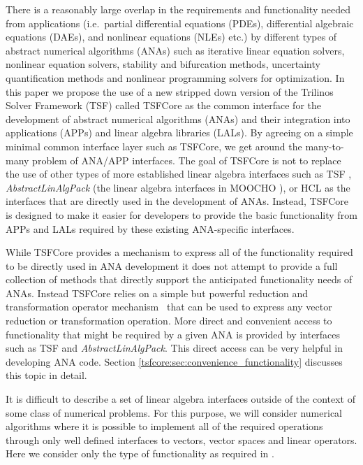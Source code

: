 \documentclass[10pt,fleqn]{article}
\begin{document}
There is a reasonably large overlap in the requirements and
functionality needed from applications (i.e.~partial differential
equations (PDEs), differential algebraic equations (DAEs), and
nonlinear equations (NLEs) etc.) by different types of abstract
numerical algorithms (ANAs) such as iterative linear equation solvers,
nonlinear equation solvers, stability and bifurcation methods,
uncertainty quantification methods and nonlinear programming solvers
for optimization.  In this paper we propose the use of a new stripped
down version of the Trilinos Solver Framework (TSF) called TSFCore as
the common interface for the development of abstract numerical
algorithms (ANAs) and their integration into applications (APPs) and
linear algebra libraries (LALs).  By agreeing on a simple minimal
common interface layer such as TSFCore, we get around the many-to-many
problem of ANA/APP interfaces.  The goal of TSFCore is not to
replace the use of other types of more established linear algebra
interfaces such as TSF \cite{ref:TSF}, \textit{AbstractLinAlgPack}
(the linear algebra interfaces in MOOCHO \cite{ref:moochouserguide}),
or HCL \cite{ref:hcl} as the interfaces that are directly used in the
development of ANAs.  Instead, TSFCore is designed to make it easier
for developers to provide the basic functionality from APPs and LALs
required by these existing ANA-specific interfaces.  

While TSFCore provides a mechanism to express 
all of the functionality required to be directly used in ANA
development it does not attempt to provide a full collection of 
methods that directly support the anticipated functionality
needs of ANAs.  Instead TSFCore relies on a simple but powerful 
reduction and transformation operator mechanism~\cite{ref:rtop_toms}
that can be used to express any vector reduction or transformation 
operation.  More direct and convenient access to functionality that might be 
required by a given ANA is 
provided by interfaces such as TSF and \textit{AbstractLinAlgPack}. 
This direct access can be very helpful in developing ANA code.
Section \ref{tsfcore:sec:convenience_functionality} discusses this topic
in detail.

It is difficult to describe a set of linear algebra interfaces outside
of the context of some class of numerical problems.  For this purpose,
we will consider numerical algorithms where it is possible to implement
all of the required operations through only well defined interfaces
to vectors, vector spaces and linear operators.  Here we consider
only the type of functionality as required in \cite{ref:opt_ctrl_itfc}.
\end{document}
